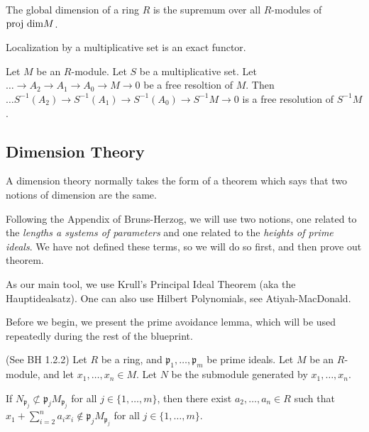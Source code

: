 \begin{definition}
  \label{def:globdim}
  The global dimension of a ring $R$
  is the supremum over all $R$-modules
  of $\text{proj dim} M$.
\end{definition}


\begin{lemma}
  \label{lem:loczn_exact}
  Localization by a multiplicative set is an exact functor.
\end{lemma}

\begin{lemma}
  \label{lem:loczn_of_resl_is_resl}
  Let $M$ be an $R$-module.
  Let $S$ be a multiplicative set.
  Let $\ldots \to A_2 \to A_1 \to A_0 \to M \to 0$
  be a free resoltion of $M$.
  Then
  $\ldots S^{-1}(A_2) \to S^{-1}(A_1) \to S^{-1}(A_0) \to S^{-1}M \to 0$
  is a free resolution of $S^{-1}M$.
\end{lemma}



\subsection{Dimension Theory}

A dimension theory normally takes the form of 
a theorem which says that two notions of dimension
are the same. 

Following the Appendix of Bruns-Herzog, we will use two 
notions, one related to the
\textit{lengths a systems of parameters} and one 
related to the \textit{heights of prime ideals}. 
We have not defined these terms, so we will do so first, and then
prove out theorem.

As our main tool, we use Krull's Principal Ideal Theorem
(aka the Hauptidealsatz). 
One can also use Hilbert Polynomials, see Atiyah-MacDonald.

Before we begin, we present the prime avoidance lemma, which will be used
repeatedly during the rest of the blueprint.

\begin{lemma}
    \label{lem:prime_avoidance}
    (See BH 1.2.2)
    Let \(R\) be a ring, and \(\mathfrak{p}_{1}, \ldots, \mathfrak{p}_{m}\)
    be prime ideals.
    Let \(M\) be an \(R\)-module, and let \(x_{1}, \ldots, x_{n} \in M\).
    Let \(N\) be the submodule generated by \(x_{1}, \ldots, x_{n}\).

    If \(N_{\mathfrak{p}_{j}} \not\subset \mathfrak{p}_{j}M_{\mathfrak{p}_{j}}\) for
    all \(j \in \{1, \ldots, m\}\), then there exist
    \(a_{2}, \ldots, a_{n} \in R\) such that
    \(x_{1} + \sum_{i=2}^{n} a_{i}x_{i} \not\in \mathfrak{p}_{j} M_{\mathfrak{p}_{j}} \)
    for all \(j \in \{1, \ldots, m\}\).
\end{lemma}

